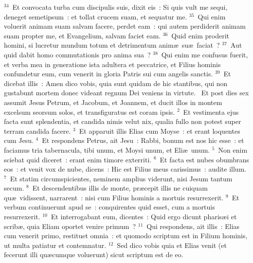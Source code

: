 ${}^{34}$~Et convocata turba cum discipulis suis, dixit eis~: Si quis vult me sequi, deneget semetipsum~: et tollat crucem suam, et sequatur me.
${}^{35}$~Qui enim voluerit animam suam salvam facere, perdet eam~: qui autem perdiderit animam suam propter me, et Evangelium, salvam faciet eam.
${}^{36}$~Quid enim proderit homini, si lucretur mundum totum et detrimentum anim\ae\ su\ae\ faciat~?
${}^{37}$~Aut quid dabit homo commutationis pro anima sua~?
${}^{38}$~Qui enim me confusus fuerit, et verba mea in generatione ista adultera et peccatrice, et Filius hominis confundetur eum, cum venerit in gloria Patris sui cum angelis sanctis.
${}^{39}$~Et dicebat illis~: Amen dico vobis, quia sunt quidam de hic stantibus, qui non gustabunt mortem donec videant regnum Dei veniens in virtute.
~Et post dies sex assumit Jesus Petrum, et Jacobum, et Joannem, et ducit illos in montem excelsum seorsum solos, et transfiguratus est coram ipsis.
${}^{2}$~Et vestimenta ejus facta sunt splendentia, et candida nimis velut nix, qualia fullo non potest super terram candida facere.
${}^{3}$~Et apparuit illis Elias cum Moyse~: et erant loquentes cum Jesu.
${}^{4}$~Et respondens Petrus, ait Jesu~: Rabbi, bonum est nos hic esse~: et faciamus tria tabernacula, tibi unum, et Moysi unum, et Eli\ae\ unum.
${}^{5}$~Non enim sciebat quid diceret~: erant enim timore exterriti.
${}^{6}$~Et facta est nubes obumbrans eos~: et venit vox de nube, dicens~: Hic est Filius meus carissimus~: audite illum.
${}^{7}$~Et statim circumspicientes, neminem amplius viderunt, nisi Jesum tantum secum.
${}^{8}$~Et descendentibus illis de monte, pr\ae cepit illis ne cuiquam qu\ae\ vidissent, narrarent~: nisi cum Filius hominis a mortuis resurrexerit.
${}^{9}$~Et verbum continuerunt apud se~: conquirentes quid esset, cum a mortuis resurrexerit.
${}^{10}$~Et interrogabant eum, dicentes~: Quid ergo dicunt pharis\ae i et scrib\ae , quia Eliam oportet venire primum~?
${}^{11}$~Qui respondens, ait illis~: Elias cum venerit primo, restituet omnia~: et quomodo scriptum est in Filium hominis, ut multa patiatur et contemnatur.
${}^{12}$~Sed dico vobis quia et Elias venit (et fecerunt illi qu\ae cumque voluerunt) sicut scriptum est de eo.


